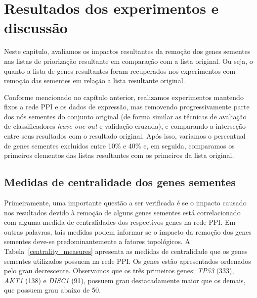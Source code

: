 \chapter[Resultados dos experimentos e discussão]{Resultados dos experimentos e discussão}

%
%
%
%
%

Neste capítulo, avaliamos os impactos resultantes da remoção dos genes sementes nas listas de priorização resultante em comparação com a lista original. 
%
Ou seja, o quanto a lista de genes resultantes foram recuperados nos experimentos com remoção das sementes em relação a lista resultante original.

Conforme mencionado no capítulo anterior, realizamos experimentos mantendo fixos a rede PPI e os dados de expressão, mas removendo progressivamente parte dos nós sementes do conjunto original (de forma similar as técnicas de avaliação de classificadores \textsl{leave-one-out} e validação cruzada), e comparando a interseção entre seus resultados com o resultado original.
Após isso, variamos o percentual de genes sementes excluídos entre 10\% e 40\% e, em seguida, comparamos os primeiros elementos das listas resultantes com os primeiros da lista original. 


%
%

\section{Medidas de centralidade dos genes sementes}

Primeiramente, uma importante questão a ser verificada é se o impacto causado nos resultados devido à remoção de alguns genes sementes está correlacionado com alguma medida de centralidades dos respectivos genes na rede PPI.
Em outras palavras, tais medidas podem informar se o impacto da remoção dos genes sementes deve-se predominantemente a fatores topológicos.
%
A Tabela~\ref{centrality_measures} apresenta as medidas de centralidade que os genes sementes utilizados possuem na rede PPI.
Os genes estão apresentados ordenados pelo grau decrescente.
Observamos que os três primeiros genes: \textsl{TP53} (333), \textsl{AKT1} (138) e \textsl{DISC1} (91), possuem grau destacadamente maior que os demais, que possuem grau abaixo de 50.

